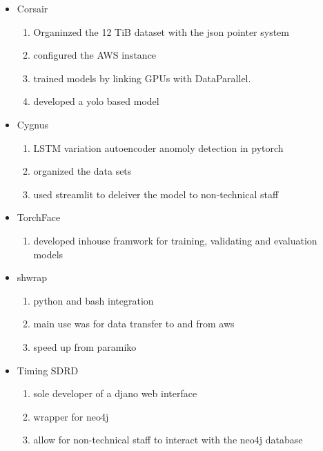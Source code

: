 \documentclass[11pt]{article}
\begin{document}
\thispagestyle{empty}

\begin{itemize} \setlength\itemsep{-0.5em}
  \item Corsair
    \begin{enumerate}
      \item Organinzed the 12 TiB dataset with the json pointer system
      \item configured the AWS instance
      \item trained models by linking GPUs with DataParallel.
      \item developed a yolo based model
    \end{enumerate}

  \item Cygnus
    \begin{enumerate}
      \item LSTM variation autoencoder anomoly detection in pytorch
      \item organized the data sets
      \item used streamlit to deleiver the model to non-technical staff
    \end{enumerate}

  \item TorchFace 
    \begin{enumerate}
      \item developed inhouse framwork for training, validating and evaluation models
    \end{enumerate} 

  \item shwrap
    \begin{enumerate}
      \item python and bash integration
      \item main use was for data transfer to and from aws
      \item speed up from paramiko
    \end{enumerate}

  \item Timing SDRD
    \begin{enumerate}
      \item sole developer of a djano web interface
      \item wrapper for neo4j
      \item allow for non-technical staff to interact with the neo4j database
    \end{enumerate}

\end{itemize}
\end{document}
